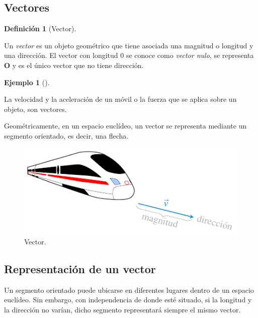 \documentclass[
  a4paper,
]{scrreport}
\theoremstyle{definition}
\newtheorem{example}{Ejemplo}[chapter]
\theoremstyle{plain}
\theoremstyle{definition}
\newtheorem{definition}{Definición}[chapter]
\theoremstyle{definition}
\theoremstyle{plain}
\theoremstyle{plain}
\theoremstyle{remark}
\begin{document}
\subsection{Vectores}\label{vectores}

\begin{definition}[Vector]\protect\hypertarget{def-vector}{}\label{def-vector}

Un \emph{vector} es un objeto geométrico que tiene asociada una magnitud
o longitud y una dirección. El vector con longitud 0 se conoce como
\emph{vector nulo}, se representa \(\mathbf{O}\) y es el único vector
que no tiene dirección.

\end{definition}

\begin{example}[]\protect\hypertarget{exm-vector}{}\label{exm-vector}

La velocidad y la aceleración de un móvil o la fuerza que se aplica
sobre un objeto, son vectores.

\end{example}

Geométricamente, en un espacio euclídeo, un vector se representa
mediante un segmento orientado, es decir, una flecha.

\begin{figure}[H]

{\centering \includegraphics{img/geometria-plano-espacio/vector.pdf}

}

\caption{Vector.}

\end{figure}%

\subsection{Representación de un
vector}\label{representaciuxf3n-de-un-vector}

Un segmento orientado puede ubicarse en diferentes lugares dentro de un
espacio euclídeo. Sin embargo, con independencia de donde esté situado,
si la longitud y la dirección no varían, dicho segmento representará
siempre el mismo vector.
\end{document}
